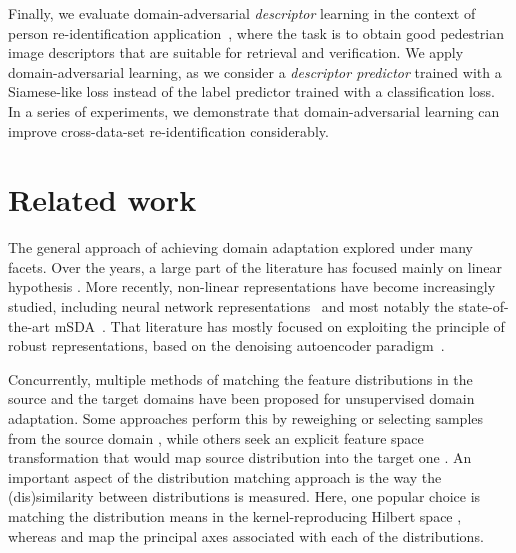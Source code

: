 \documentclass[twoside,11pt]{article}
\begin{document}
Finally, we evaluate domain-adversarial \textit{descriptor} learning in the context of person re-identification application~\citep{gong2014person}, where the task is to obtain good pedestrian image descriptors that are suitable for retrieval and verification. We apply domain-adversarial learning, as we consider a \textit{descriptor predictor} trained with a Siamese-like loss instead of the label predictor trained with a classification loss. In a series of experiments, we demonstrate that domain-adversarial learning can improve cross-data-set re-identification considerably. 


\section{Related work}
\label{sec:related}

The general approach of achieving domain adaptation
explored under many facets. Over the years, a large part of the literature has focused mainly on linear 
hypothesis \citep[see for instance][]{BlitzerMP06,BruzzoneM10S,pbda,Baktashmotlagh13,CortesM14}.
More recently, non-linear representations have become increasingly studied,
including neural network representations~\citep{Glorot11,LiY2014} and most notably
the state-of-the-art mSDA~\citep{Chen12}. That literature has mostly focused
on exploiting the principle of robust representations, based on the denoising autoencoder paradigm~\citep{VincentP2008}. 

Concurrently, multiple methods of matching the feature distributions in the source and the target domains have been proposed for unsupervised domain adaptation. Some approaches perform this by reweighing or selecting samples from the source domain \citep{Borgwardt06,Huang06,Gong13}, while others seek an explicit feature space transformation that would map source distribution into the target one \citep{Pan11,Gopalan11,Baktashmotlagh13}. An important aspect of the distribution matching approach is the way the (dis)similarity between distributions is measured.  Here, one popular choice is matching the distribution means in the kernel-reproducing Hilbert space \citep{Borgwardt06,Huang06}, whereas \citet{Gong12} and \citet{Fernando13} map the principal axes associated with each of the distributions. 
\end{document}
